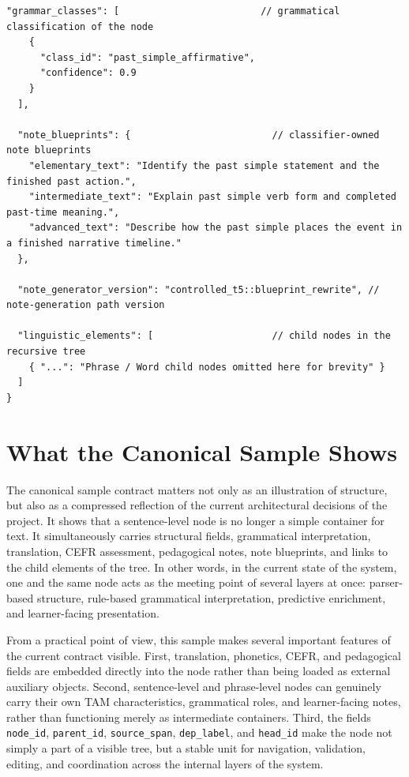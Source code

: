 \documentclass[12pt,a4paper,oneside]{report}
\begin{document}
\begin{lstlisting}[style=jsonstyle,caption={Current sentence-level RLE contract example},label={lst:rleexample}]
  "grammar_classes": [                         // grammatical classification of the node
    {
      "class_id": "past_simple_affirmative",
      "confidence": 0.9
    }
  ],

  "note_blueprints": {                         // classifier-owned note blueprints
    "elementary_text": "Identify the past simple statement and the finished past action.",
    "intermediate_text": "Explain past simple verb form and completed past-time meaning.",
    "advanced_text": "Describe how the past simple places the event in a finished narrative timeline."
  },

  "note_generator_version": "controlled_t5::blueprint_rewrite", // note-generation path version

  "linguistic_elements": [                     // child nodes in the recursive tree
    { "...": "Phrase / Word child nodes omitted here for brevity" }
  ]
}
\end{lstlisting}

\section{What the Canonical Sample Shows}
The canonical sample contract matters not only as an illustration of structure, but also as a compressed reflection of the current architectural decisions of the project. It shows that a sentence-level node is no longer a simple container for text. It simultaneously carries structural fields, grammatical interpretation, translation, CEFR assessment, pedagogical notes, note blueprints, and links to the child elements of the tree. In other words, in the current state of the system, one and the same node acts as the meeting point of several layers at once: parser-based structure, rule-based grammatical interpretation, predictive enrichment, and learner-facing presentation.

From a practical point of view, this sample makes several important features of the current contract visible. First, translation, phonetics, CEFR, and pedagogical fields are embedded directly into the node rather than being loaded as external auxiliary objects. Second, sentence-level and phrase-level nodes can genuinely carry their own TAM characteristics, grammatical roles, and learner-facing notes, rather than functioning merely as intermediate containers. Third, the fields \texttt{node\_id}, \texttt{parent\_id}, \texttt{source\_span}, \texttt{dep\_label}, and \texttt{head\_id} make the node not simply a part of a visible tree, but a stable unit for navigation, validation, editing, and coordination across the internal layers of the system.
\end{document}

